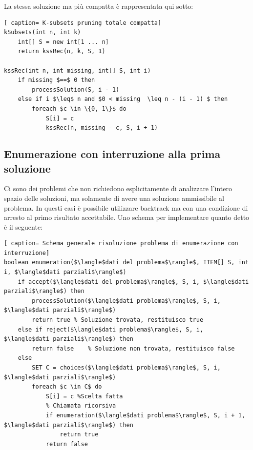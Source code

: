 \documentclass[../cheatSheetAlgoritmi.tex]{subfiles}
\begin{document}
La stessa soluzione ma più compatta è rappresentata qui sotto:
 \begin{lstlisting}[ caption= K-subsets pruning totale compatta]
kSubsets(int n, int k)
	int[] S = new int[1 ... n]
	return kssRec(n, k, S, 1)

kssRec(int n, int missing, int[] S, int i)
	if missing $==$ 0 then
		processSolution(S, i - 1)
	else if i $\leq$ n and $0 < missing  \leq n - (i - 1) $ then
		foreach $c \in \{0, 1\}$ do
			S[i] = c
			kssRec(n, missing - c, S, i + 1)
\end{lstlisting}
\subsection{Enumerazione con interruzione alla prima soluzione}
Ci sono dei problemi che non richiedono esplicitamente di analizzare l'intero spazio delle soluzioni, ma solamente di avere una soluzione ammissibile al problema. In questi casi è possibile utilizzare backtrack ma con una condizione di arresto al primo risultato accettabile. Uno schema per implementare quanto detto è il seguente:
 \begin{lstlisting}[ caption= Schema generale risoluzione problema di enumerazione con interruzione]
boolean enumeration($\langle$dati del problema$\rangle$, ITEM[] S, int i, $\langle$dati parziali$\rangle$)
	if accept($\langle$dati del problema$\rangle$, S, i, $\langle$dati parziali$\rangle$) then
		processSolution($\langle$dati problema$\rangle$, S, i, $\langle$dati parziali$\rangle$)
		return true	% Soluzione trovata, restituisco true
	else if reject($\langle$dati problema$\rangle$, S, i, $\langle$dati parziali$\rangle$) then	
		return false	% Soluzione non trovata, restituisco false
	else
		SET C = choices($\langle$dati problema$\rangle$, S, i, $\langle$dati parziali$\rangle$)
		foreach $c \in C$ do
			S[i] = c %Scelta fatta
			% Chiamata ricorsiva
			if enumeration($\langle$dati problema$\rangle$, S, i + 1, $\langle$dati parziali$\rangle$) then
				return true
			return false
\end{lstlisting}
\end{document}
